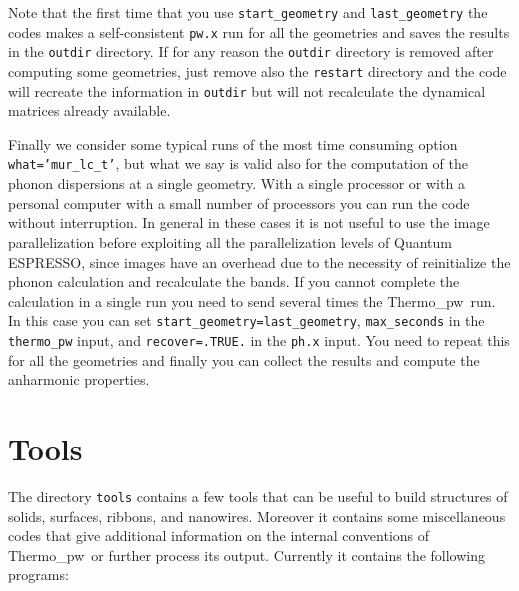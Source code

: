 \documentclass[12pt,a4paper,twoside]{report}
\def\qe{{\sc Quantum ESPRESSO}}
\def\thermo{{\sc Thermo}\_{\sc pw}}
\begin{document}
Note that the first time that you use \texttt{start\_geometry} and 
\texttt{last\_geometry} the codes makes a self-consistent \texttt{pw.x} 
run for all the geometries and saves the results in the \texttt{outdir}
directory. If for any reason the \texttt{outdir} directory is removed 
after computing some geometries, just remove also the
\texttt{restart} directory and the code will recreate the information
in \texttt{outdir} but will not recalculate the dynamical matrices 
already available. 

Finally we consider some typical runs of the most time consuming option
\texttt{what='mur\_lc\_t'}, but what we say is valid also for the computation
of the phonon dispersions at a single geometry.
With a single processor or with a personal computer with a small number of 
processors you can run the code without interruption.
In general in these cases it is not useful to use the image parallelization
before exploiting all the parallelization levels of \qe, since 
images have an overhead due to the necessity of reinitialize the phonon
calculation and recalculate the bands.
If you cannot complete the calculation in a single run 
you need to send several times the \thermo\ run. 
In this case you can set \texttt{start\_geometry=last\_geometry},
\texttt{max\_seconds} in the \texttt{thermo\_pw} input,
and \texttt{recover=.TRUE.} in the \texttt{ph.x} input. You need to
repeat this for all the geometries and finally you can collect the results
and compute the anharmonic properties.


\newpage
{\color{dark-blue}\chapter{Tools}}
\color{black}

The directory \texttt{tools} contains a few tools that can be useful to build
structures of solids, surfaces, ribbons, and nanowires. Moreover it 
contains some miscellaneous codes that give additional information
on the internal conventions of \thermo\ or further process its output. 
Currently it contains the following programs:
\end{document}
